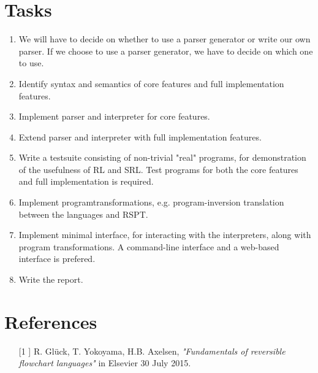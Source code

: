 \section{Tasks}
\label{sec:tasks}

\begin{enumerate}

  \item We will have to decide on whether to use a parser generator or write our own parser. If we choose to use a parser generator, we have to decide on which one to use.

  \item Identify syntax and semantics of core features and full implementation features.

  \item Implement parser and interpreter for core features.

  \item Extend parser and interpreter with full implementation features.

  \item Write a testsuite consisting of non-trivial "real" programs, for demonstration of the usefulness of RL and SRL. Test programs for both the core features and full implementation is required.

  \item Implement programtransformations, e.g. program-inversion translation between the languages and RSPT.

  \item Implement minimal interface, for interacting with the interpreters, along with program transformations. A command-line interface and a web-based interface is prefered.

  \item Write the report.

\end{enumerate}


\appendix
\section{References}

\begin{enumerate}
  \item[[1]] R. Glück, T. Yokoyama, H.B. Axelsen, \textit{"Fundamentals of reversible flowchart languages"} in Elsevier 30 July 2015.
\end{enumerate}
